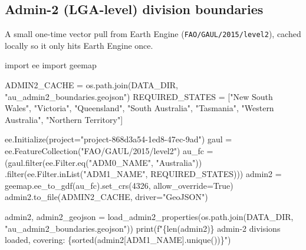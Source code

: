 \documentclass[
  letterpaper,
  DIV=11,
  numbers=noendperiod]{scrartcl}
\newenvironment{Shaded}{\begin{snugshade}}{\end{snugshade}}
\newcommand{\BuiltInTok}[1]{\textcolor[rgb]{0.00,0.23,0.31}{#1}}
\newcommand{\DecValTok}[1]{\textcolor[rgb]{0.68,0.00,0.00}{#1}}
\newcommand{\ImportTok}[1]{\textcolor[rgb]{0.00,0.46,0.62}{#1}}
\newcommand{\NormalTok}[1]{\textcolor[rgb]{0.00,0.23,0.31}{#1}}
\newcommand{\OperatorTok}[1]{\textcolor[rgb]{0.37,0.37,0.37}{#1}}
\newcommand{\SpecialCharTok}[1]{\textcolor[rgb]{0.37,0.37,0.37}{#1}}
\newcommand{\SpecialStringTok}[1]{\textcolor[rgb]{0.13,0.47,0.30}{#1}}
\newcommand{\StringTok}[1]{\textcolor[rgb]{0.13,0.47,0.30}{#1}}
\newcommand{\VariableTok}[1]{\textcolor[rgb]{0.07,0.07,0.07}{#1}}
\begin{document}
\subsection{Admin-2 (LGA-level) division
boundaries}\label{admin-2-lga-level-division-boundaries}

A small one-time vector pull from Earth Engine
(\texttt{FAO/GAUL/2015/level2}), cached locally so it only hits Earth
Engine once.

\begin{Shaded}
\begin{Highlighting}[]
\ImportTok{import}\NormalTok{ ee}
\ImportTok{import}\NormalTok{ geemap}

\NormalTok{ADMIN2\_CACHE }\OperatorTok{=}\NormalTok{ os.path.join(DATA\_DIR, }\StringTok{"au\_admin2\_boundaries.geojson"}\NormalTok{)}
\NormalTok{REQUIRED\_STATES }\OperatorTok{=}\NormalTok{ [}\StringTok{"New South Wales"}\NormalTok{, }\StringTok{"Victoria"}\NormalTok{, }\StringTok{"Queensland"}\NormalTok{, }\StringTok{"South Australia"}\NormalTok{,}
                   \StringTok{"Tasmania"}\NormalTok{, }\StringTok{"Western Australia"}\NormalTok{, }\StringTok{"Northern Territory"}\NormalTok{]}

\NormalTok{ee.Initialize(project}\OperatorTok{=}\StringTok{"project{-}868d3a54{-}1ed8{-}47ec{-}9ad"}\NormalTok{)}
\NormalTok{gaul }\OperatorTok{=}\NormalTok{ ee.FeatureCollection(}\StringTok{"FAO/GAUL/2015/level2"}\NormalTok{)}
\NormalTok{au\_fc }\OperatorTok{=}\NormalTok{ (gaul.}\BuiltInTok{filter}\NormalTok{(ee.Filter.eq(}\StringTok{"ADM0\_NAME"}\NormalTok{, }\StringTok{"Australia"}\NormalTok{))}
\NormalTok{              .}\BuiltInTok{filter}\NormalTok{(ee.Filter.inList(}\StringTok{"ADM1\_NAME"}\NormalTok{, REQUIRED\_STATES)))}
\NormalTok{admin2 }\OperatorTok{=}\NormalTok{ geemap.ee\_to\_gdf(au\_fc).set\_crs(}\DecValTok{4326}\NormalTok{, allow\_override}\OperatorTok{=}\VariableTok{True}\NormalTok{)}
\NormalTok{admin2.to\_file(ADMIN2\_CACHE, driver}\OperatorTok{=}\StringTok{"GeoJSON"}\NormalTok{)}
\end{Highlighting}
\end{Shaded}

\begin{Shaded}
\begin{Highlighting}[]
\NormalTok{admin2, admin2\_geojson }\OperatorTok{=}\NormalTok{ load\_admin2\_properties(os.path.join(DATA\_DIR, }\StringTok{"au\_admin2\_boundaries.geojson"}\NormalTok{))}
\BuiltInTok{print}\NormalTok{(}\SpecialStringTok{f"}\SpecialCharTok{\{}\BuiltInTok{len}\NormalTok{(admin2)}\SpecialCharTok{\}}\SpecialStringTok{ admin{-}2 divisions loaded, covering: }\SpecialCharTok{\{}\BuiltInTok{sorted}\NormalTok{(admin2[}\StringTok{\textquotesingle{}ADM1\_NAME\textquotesingle{}}\NormalTok{].unique())}\SpecialCharTok{\}}\SpecialStringTok{"}\NormalTok{)}
\end{Highlighting}
\end{Shaded}
\end{document}
